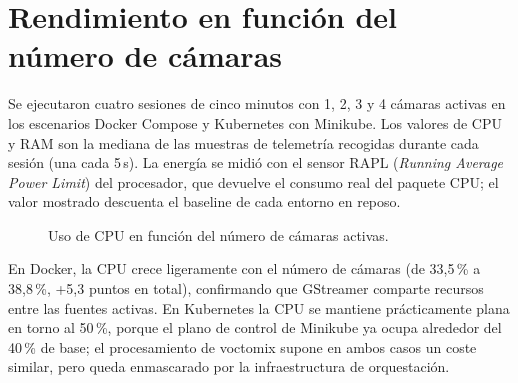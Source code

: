 \section{Rendimiento en función del número de cámaras}
\label{sec:rendimiento_camaras}

Se ejecutaron cuatro sesiones de cinco minutos con 1, 2, 3 y 4 cámaras activas
en los escenarios Docker Compose y Kubernetes con Minikube. Los valores de CPU y RAM son la mediana de las
muestras de telemetría recogidas durante cada sesión (una cada 5\,s). La energía
se midió con el sensor RAPL (\textit{Running Average Power Limit}) del procesador, que devuelve el consumo real del
paquete CPU; el valor mostrado descuenta el baseline de cada entorno en reposo.

\begin{figure}[H]
  \centering
  \caption{Uso de CPU en función del número de cámaras activas.}
  \label{fig:cpu_camaras}
\end{figure}

En Docker, la CPU crece ligeramente con el número de cámaras (de 33{,}5\,\% a
38{,}8\,\%, +5{,}3 puntos en total), confirmando que GStreamer comparte recursos
entre las fuentes activas. En Kubernetes la CPU se mantiene prácticamente plana
en torno al 50\,\%, porque el plano de control de Minikube ya ocupa alrededor
del 40\,\% de base; el procesamiento de voctomix supone en ambos casos un coste
similar, pero queda enmascarado por la infraestructura de orquestación.

